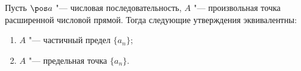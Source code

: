 \label{The20}
Пусть $\pos a$ "--- числовая последовательность, $A$ "---
произвольная точка расширенной числовой прямой. Тогда следующие утверждения эквивалентны:

\begin{enumerate}
    \item $A$ "--- частичный предел $\{a_n\}$;

    \item $A$ "--- предельная точка $\{a_n\}$.
\end{enumerate}
